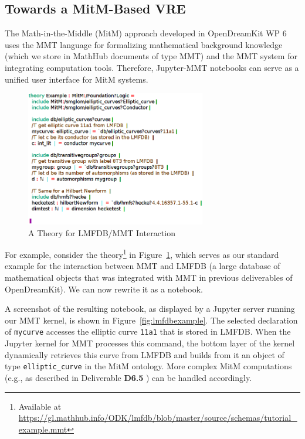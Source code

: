 \subsection{Towards a MitM-Based VRE}

The Math-in-the-Middle (MitM) approach developed in OpenDreamKit WP 6 uses the MMT language for formalizing mathematical background knowledge (which we store in MathHub documents of type MMT) and the MMT system for integrating computation tools.
Therefore, Jupyter-MMT notebooks can serve as a unified user interface for MitM systems.

\begin{figure}[ht]\centering
  \includegraphics[width=0.7\textwidth]{hecke}
  \caption{A Theory for LMFDB/MMT Interaction}\label{fig:hecke}
\end{figure}

For example, consider the theory\footnote{Available at \url{https://gl.mathhub.info/ODK/lmfdb/blob/master/source/schemas/tutorial_example.mmt}}  in Figure~\ref{fig:hecke}, which serves as our standard example for the interaction between MMT and LMFDB (a large database of mathematical objects that was integrated with MMT in previous deliverables of OpenDreamKit).
We can now rewrite it as a notebook.


A screenshot of the resulting notebook, as displayed by a Jupyter server running our MMT kernel, is shown in Figure~\ref{fig:lmfdbexample}.
The selected declaration of \texttt{mycurve} accesses the elliptic curve \texttt{11a1} that is stored in LMFDB.
When the Jupyter kernel for MMT processes this command, the bottom layer of the kernel dynamically retrieves this curve from LMFDB and builds from it an object of type \texttt{elliptic\_curve} in the MitM ontology.
More complex MitM computations (e.g., as described in Deliverable \textbf{D6.5} \cite{ODK-D6.5}) can be handled accordingly.

